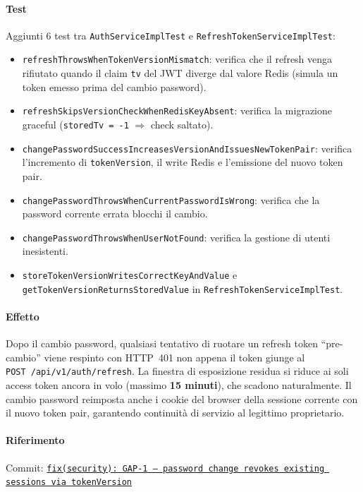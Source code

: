 ﻿\documentclass[a4paper,12pt]{report}
\newcommand{\commitref}[2]{\texttt{\small \href{https://github.com/diegoandruccioli/hotel-pms/commit/#1}{#2}}}
\begin{document}
\paragraph{Test}
Aggiunti 6 test tra \texttt{AuthServiceImplTest} e \texttt{RefreshTokenServiceImplTest}:
\begin{itemize}
  \item \texttt{refreshThrowsWhenTokenVersionMismatch}: verifica che il refresh
        venga rifiutato quando il claim \texttt{tv} del JWT diverge dal valore Redis
        (simula un token emesso prima del cambio password).
  \item \texttt{refreshSkipsVersionCheckWhenRedisKeyAbsent}: verifica la migrazione
        graceful (\texttt{storedTv = -1} $\Rightarrow$ check saltato).
  \item \texttt{changePasswordSuccessIncreasesVersionAndIssuesNewTokenPair}: verifica
        l'incremento di \texttt{tokenVersion}, il write Redis e l'emissione del nuovo
        token pair.
  \item \texttt{changePasswordThrowsWhenCurrentPasswordIsWrong}: verifica che la
        password corrente errata blocchi il cambio.
  \item \texttt{changePasswordThrowsWhenUserNotFound}: verifica la gestione di utenti
        inesistenti.
  \item \texttt{storeTokenVersionWritesCorrectKeyAndValue} e \\
        \texttt{getTokenVersionReturnsStoredValue} in \texttt{RefreshTokenServiceImplTest}.
\end{itemize}

\paragraph{Effetto}
Dopo il cambio password, qualsiasi tentativo di ruotare un refresh token
``pre-cambio'' viene respinto con HTTP~401 non appena il token giunge al \\
\texttt{POST /api/v1/auth/refresh}. La finestra di esposizione residua si riduce
ai soli access token ancora in volo (massimo \textbf{15 minuti}), che scadono
naturalmente. Il cambio password reimposta anche i cookie del browser della
sessione corrente con il nuovo token pair, garantendo continuità di servizio
al legittimo proprietario.

\paragraph{Riferimento} Commit: \commitref{b473265}{fix(security): GAP-1 --- password change revokes existing sessions via tokenVersion}
\end{document}
